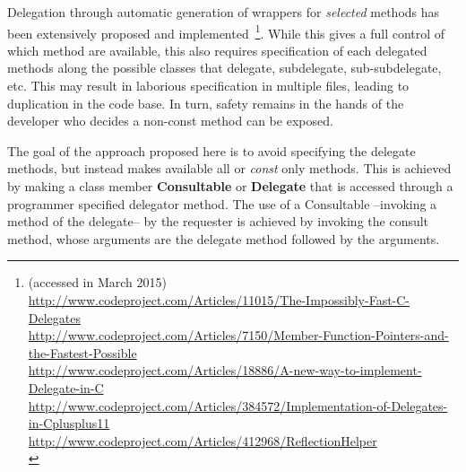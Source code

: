 \documentclass{article}
\begin{document}
Delegation through automatic generation of wrappers for \textit{selected} methods has been extensively proposed and implemented~\footnote{(accessed in March 2015)\\
\url{http://www.codeproject.com/Articles/11015/The-Impossibly-Fast-C-Delegates}\\
\url{http://www.codeproject.com/Articles/7150/Member-Function-Pointers-and-the-Fastest-Possible}\\
\url{http://www.codeproject.com/Articles/18886/A-new-way-to-implement-Delegate-in-C}\\
\url{http://www.codeproject.com/Articles/384572/Implementation-of-Delegates-in-Cplusplus11}\\
\url{http://www.codeproject.com/Articles/412968/ReflectionHelper}\\
}.  While this gives a full control of which method are available, this also requires specification of each delegated methods along the possible classes that delegate, subdelegate, sub-subdelegate, etc. This may result in laborious specification in multiple files, leading to duplication in the code base. In turn, safety remains in the hands of the developer who decides a non-const method can be exposed. 

The goal of the approach proposed here is to avoid specifying the delegate methods, but instead makes available all or \textit{const} only methods. This is achieved by making a class member \textbf{Consultable} or \textbf{Delegate} that is accessed through a programmer specified delegator method. The use of a Consultable --invoking a method of the delegate-- by the requester is achieved by invoking the consult method, whose arguments are the delegate method followed by the arguments. 
\end{document}
